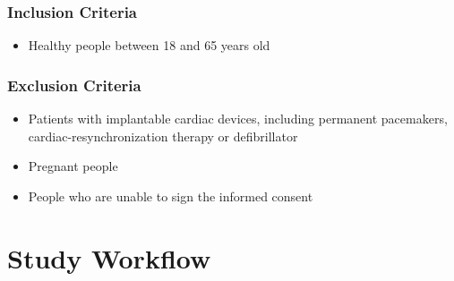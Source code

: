 \documentclass{article}
\begin{document}
\subsubsection{Inclusion Criteria}
\begin{itemize}
\item Healthy people between 18 and 65 years old
\end{itemize}

\subsubsection{Exclusion Criteria}
\begin{itemize}
\item Patients with implantable cardiac devices, including permanent pacemakers, cardiac-resynchronization therapy or defibrillator
\item Pregnant people
\item People who are unable to sign the informed consent

\end{itemize}

\section{Study Workflow}
\end{document}
